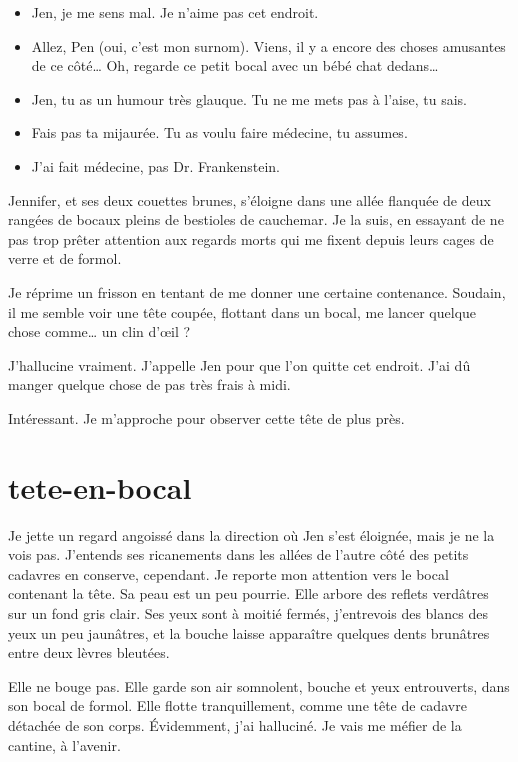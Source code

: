 \begin{itemize}
\item Jen, je me sens mal. Je n'aime pas cet endroit.
\item Allez, Pen (oui, c'est mon surnom). Viens, il y a encore des choses amusantes de ce côté… Oh, regarde ce petit bocal avec un bébé chat dedans…
\item Jen, tu as un humour très glauque. Tu ne me mets pas à l'aise, tu sais.
\item Fais pas ta mijaurée. Tu as voulu faire médecine, tu assumes.
\item J'ai fait médecine, pas Dr. Frankenstein.
\end{itemize}

Jennifer, et ses deux couettes brunes, s'éloigne dans une allée flanquée de deux rangées de bocaux pleins de bestioles de cauchemar. Je la suis, en essayant de ne pas trop prêter attention aux regards morts qui me fixent depuis leurs cages de verre et de formol.

Je réprime un frisson en tentant de me donner une certaine contenance. Soudain, il me semble voir une tête coupée, flottant dans un bocal, me lancer quelque chose comme… un clin d'œil ?

\item J'hallucine vraiment. J'appelle Jen pour que l'on quitte cet endroit. J'ai dû manger quelque chose de pas très frais à midi.
\item Intéressant. Je m'approche pour observer cette tête de plus près. 
\enw

\section{tete-en-bocal}

Je jette un regard angoissé dans la direction où Jen s'est éloignée, mais je ne la vois pas. J'entends ses ricanements dans les allées de l'autre côté des petits cadavres en conserve, cependant. Je reporte mon attention vers le bocal contenant la tête. Sa peau est un peu pourrie. Elle arbore des reflets verdâtres sur un fond gris clair. Ses yeux sont à moitié fermés, j'entrevois des blancs des yeux un peu jaunâtres, et la bouche laisse apparaître quelques dents brunâtres entre deux lèvres bleutées.

Elle ne bouge pas. Elle garde son air somnolent, bouche et yeux entrouverts, dans son bocal de formol. Elle flotte tranquillement, comme une tête de cadavre détachée de son corps. Évidemment, j'ai halluciné. Je vais me méfier de la cantine, à l'avenir.

